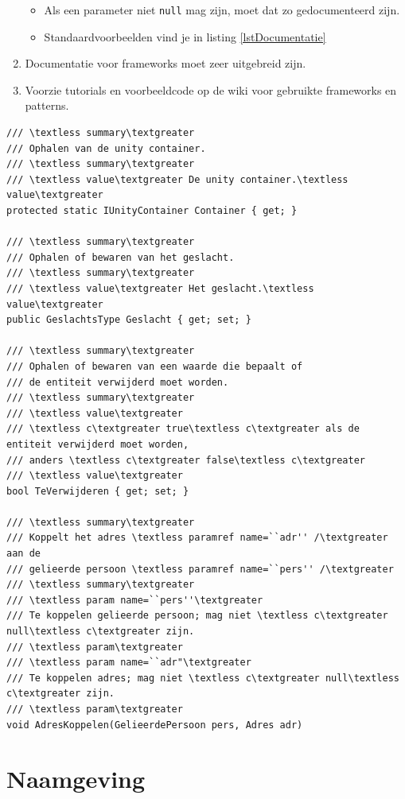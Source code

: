 \documentclass[a4paper,11pt]{article}
\begin{document}
\begin{enumerate}[resume]
\begin{itemize}
\item Als een parameter niet \lstinline !null! mag zijn, moet dat zo
gedocumenteerd zijn.
\item Standaardvoorbeelden vind je in listing \ref{lstDocumentatie}
\end{itemize}
\item Documentatie voor frameworks moet zeer uitgebreid zijn.
\item Voorzie tutorials en
voorbeeldcode op de wiki voor gebruikte frameworks en
patterns.
\end{enumerate}

\begin{lstlisting}[float,caption=XML-documentatie, label=lstDocumentatie]
/// \textless summary\textgreater
/// Ophalen van de unity container.
/// \textless summary\textgreater
/// \textless value\textgreater De unity container.\textless value\textgreater
protected static IUnityContainer Container { get; }

/// \textless summary\textgreater
/// Ophalen of bewaren van het geslacht.
/// \textless summary\textgreater
/// \textless value\textgreater Het geslacht.\textless value\textgreater
public GeslachtsType Geslacht { get; set; }

/// \textless summary\textgreater
/// Ophalen of bewaren van een waarde die bepaalt of 
/// de entiteit verwijderd moet worden.
/// \textless summary\textgreater
/// \textless value\textgreater
/// \textless c\textgreater true\textless c\textgreater als de entiteit verwijderd moet worden,
/// anders \textless c\textgreater false\textless c\textgreater
/// \textless value\textgreater
bool TeVerwijderen { get; set; }

/// \textless summary\textgreater
/// Koppelt het adres \textless paramref name=``adr'' /\textgreater aan de 
/// gelieerde persoon \textless paramref name=``pers'' /\textgreater
/// \textless summary\textgreater
/// \textless param name=``pers''\textgreater
/// Te koppelen gelieerde persoon; mag niet \textless c\textgreater null\textless c\textgreater zijn.
/// \textless param\textgreater
/// \textless param name=``adr"\textgreater
/// Te koppelen adres; mag niet \textless c\textgreater null\textless c\textgreater zijn.
/// \textless param\textgreater
void AdresKoppelen(GelieerdePersoon pers, Adres adr)
\end{lstlisting}

\section{Naamgeving}
\end{document}
